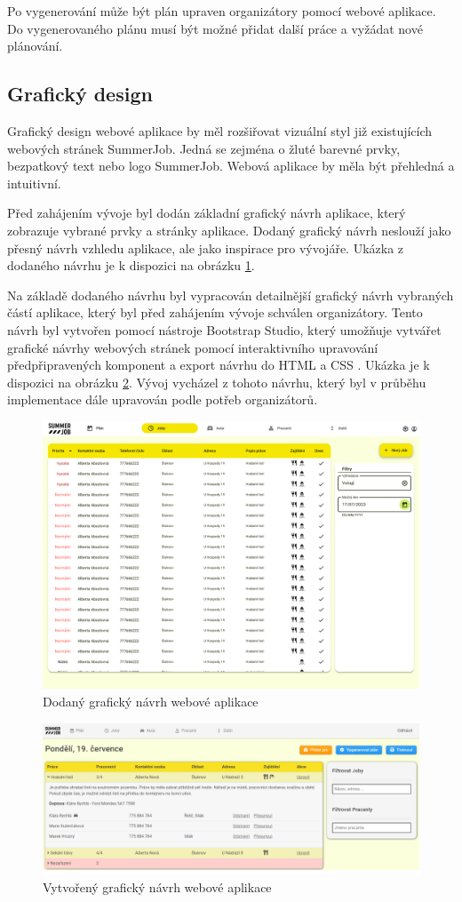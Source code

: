 Po vygenerování může být plán upraven organizátory pomocí webové aplikace. Do vygenerovaného plánu musí být možné přidat další práce a vyžádat nové plánování.

\subsection{Grafický design}

Grafický design webové aplikace by měl rozšiřovat vizuální styl již existujících webových stránek SummerJob. Jedná se zejména o žluté barevné prvky, bezpatkový text nebo
logo SummerJob. Webová aplikace by měla být přehledná a intuitivní.

Před zahájením vývoje byl dodán základní grafický návrh aplikace, který zobrazuje vybrané prvky a stránky aplikace.
Dodaný grafický návrh neslouží jako přesný návrh vzhledu aplikace, ale jako inspirace pro vývojáře. Ukázka z dodaného návrhu je k dispozici na obrázku \ref{fig:design}.

Na základě dodaného návrhu byl vypracován detailnější grafický návrh vybraných částí aplikace, který byl před zahájením vývoje schválen organizátory.
Tento návrh byl vytvořen pomocí nástroje Bootstrap Studio, který umožňuje vytvářet grafické návrhy webových stránek pomocí interaktivního
upravování předpřipravených komponent a export návrhu do HTML a CSS \cite{bootstrap_studio}.
Ukázka je k dispozici na obrázku \ref{fig:design-detail}. Vývoj vycházel z tohoto návrhu, který byl v průběhu implementace dále upravován podle potřeb organizátorů.

\begin{figure}[ht]
    \centering
    \includegraphics[width=\textwidth]{chapters/images/graficky-navrh}
    \caption{Dodaný grafický návrh webové aplikace}
    \label{fig:design}
\end{figure}

\begin{figure}[ht]
    \centering
    \includegraphics[width=\textwidth]{chapters/images/bootstrap-studio}
    \caption{Vytvořený grafický návrh webové aplikace}
    \label{fig:design-detail}
\end{figure}